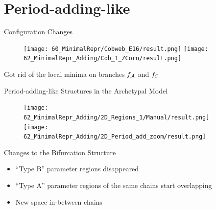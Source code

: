 \section{Period-adding-like}

\begin{frame}{Configuration Changes}
	\vspace{-1em}
	\begin{figure}
		\texttt{[image: 60\_MinimalRepr/Cobweb\_E16/result.png]}
		\quad
		\texttt{[image: 62\_MinimalRepr\_Adding/Cob\_1\_ZCorn/result.png]}
	\end{figure}
	\vspace{1em}
	Got rid of the local minima on branches $f_{\mathcal{A}}$ and $f_{\mathcal{C}}$
\end{frame}

\begin{frame}{Period-adding-like Structures in the Archetypal Model}
	\begin{figure}
		\texttt{[image: 62\_MinimalRepr\_Adding/2D\_Regions\_1/Manual/result.png]}
		\quad
		\texttt{[image: 62\_MinimalRepr\_Adding/2D\_Period\_add\_zoom/result.png]}
	\end{figure}
\end{frame}

\begin{frame}{Changes to the Bifurcation Structure}
	\begin{itemize}
		\item ``Type B'' parameter regions disappeared
		\item ``Type A'' parameter regions of the same chains start overlapping
		      \pause
		\item New space in-between chains
	\end{itemize}
\end{frame}

